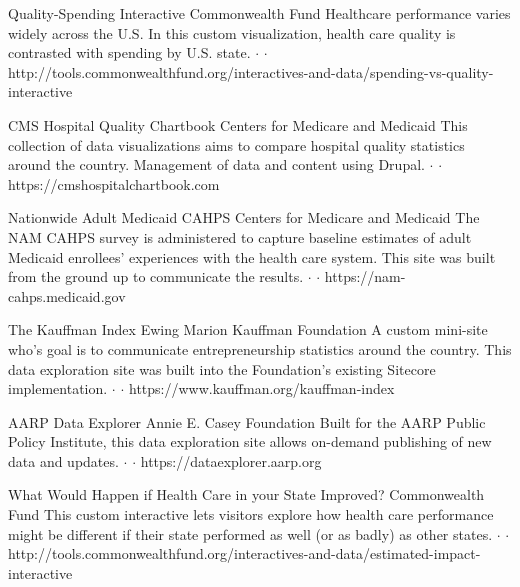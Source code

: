 \documentclass{article}
\begin{document}
{Quality-Spending Interactive}
{Commonwealth Fund}
{
  Healthcare performance varies widely across the U.S. In this custom visualization, health care quality is contrasted with spending by U.S. state.
  $\cdot$  
  $\cdot$ http://tools.commonwealthfund.org/interactives-and-data/spending-vs-quality-interactive
}

{CMS Hospital Quality Chartbook}
{Centers for Medicare and Medicaid}
{
  This collection of data visualizations aims to compare hospital quality statistics around the country. Management of data and content using Drupal.
  $\cdot$  
  $\cdot$ \\ https://cmshospitalchartbook.com
}

{Nationwide Adult Medicaid CAHPS}
{Centers for Medicare and Medicaid}
{
  The NAM CAHPS survey is administered to capture baseline estimates of adult Medicaid enrollees’ experiences with the health care system. This site was built from the ground up to communicate the results.
  $\cdot$  
  $\cdot$ https://nam-cahps.medicaid.gov
}

{The Kauffman Index}
{Ewing Marion Kauffman Foundation}
{
  A custom mini-site who's goal is to communicate entrepreneurship statistics around the country. This data exploration site was built into the Foundation's existing Sitecore implementation.
  $\cdot$  
  $\cdot$ https://www.kauffman.org/kauffman-index
}

{AARP Data Explorer}
{Annie E. Casey Foundation}
{
  Built for the AARP Public Policy Institute, this data exploration site allows on-demand publishing of new data and updates.
  $\cdot$  
  $\cdot$ https://dataexplorer.aarp.org
}

{What Would Happen if Health Care in your State Improved?}
{Commonwealth Fund}
{
  This custom interactive lets visitors explore how health care performance might be different if their state performed as well (or as badly) as other states.
  $\cdot$  
  $\cdot$ http://tools.commonwealthfund.org/interactives-and-data/estimated-impact-interactive 
}
\end{document}
